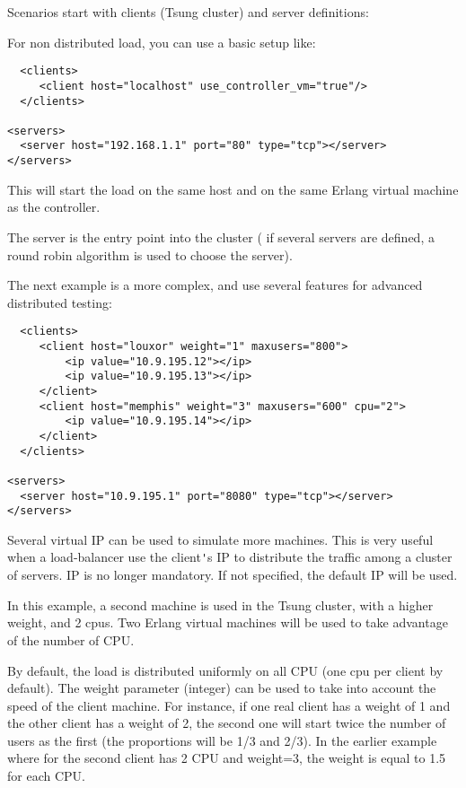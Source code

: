 \documentclass{IDXDOC-en}
\begin{document}
 Scenarios start with clients (Tsung cluster) and server definitions:

For non distributed load, you can use a basic setup like:

\begin{Verbatim}
  <clients>
     <client host="localhost" use_controller_vm="true"/>
  </clients>

<servers>
  <server host="192.168.1.1" port="80" type="tcp"></server>
</servers>
 \end{Verbatim}

This will start the load on the same host and on the same Erlang
virtual machine as the controller.

The server is the entry point into the cluster (
if several servers are defined, a round robin algorithm is used to
choose the server).

The next example is a more complex, and use several features for
advanced distributed testing:

\begin{Verbatim}
  <clients>
     <client host="louxor" weight="1" maxusers="800">
         <ip value="10.9.195.12"></ip>
         <ip value="10.9.195.13"></ip>
     </client>
     <client host="memphis" weight="3" maxusers="600" cpu="2">
         <ip value="10.9.195.14"></ip>
     </client>
  </clients>

<servers>
  <server host="10.9.195.1" port="8080" type="tcp"></server>
</servers>
 \end{Verbatim}


 Several virtual IP can be used to simulate more machines. This is
 very useful when a load-balancer use the client\verb|'|s IP to
 distribute the traffic among a cluster of servers.  IP is no longer mandatory. If not specified, the default IP will
 be used.

 In this example, a second machine is used in the Tsung cluster,
 with a higher weight, and 2 cpus. Two Erlang virtual machines will be
 used to take advantage of the number of CPU.

 By default, the load is distributed uniformly on all CPU (one cpu
 per client by default). The weight parameter (integer) can be used to
 take into account the speed of the client machine. For instance, if
 one real client has a weight of 1 and the other client has a weight
 of 2, the second one will start twice the number of users as the
 first (the proportions will be 1/3 and 2/3). In the earlier example
 where for the second client has 2 CPU and weight=3, the weight is
 equal to 1.5 for each CPU.
\end{document}
